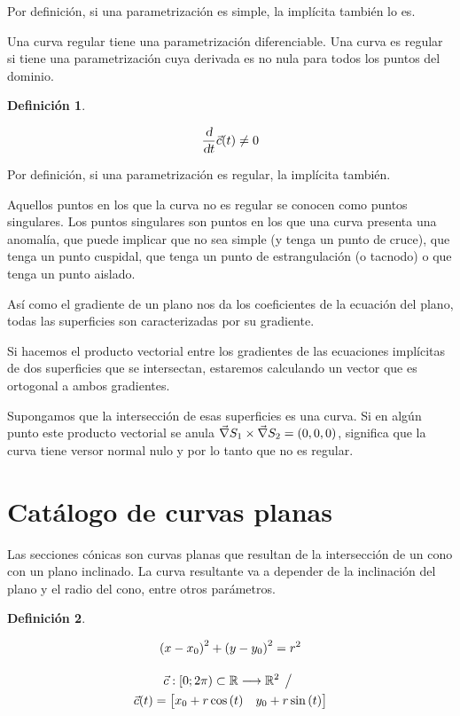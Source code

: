 \documentclass[a5paper,12pt,twoside]{book}
\newtheorem{defn}{{Definición}}[chapter]
\begin{document}
Por definición, si una parametrización es simple, la implícita también lo es.

Una curva regular tiene una parametrización diferenciable. Una curva es regular si tiene una parametrización cuya derivada es no nula para todos los puntos del dominio.

\begin{mdframed}[style=MyFrame1]
    \begin{defn}
    \end{defn}
    \begin{equation*}
        \frac{\textsl{d}}{\textsl{d} t} \Vec{c}(t) \neq 0
    \end{equation*}
\end{mdframed}

Por definición, si una parametrización es regular, la implícita también. 

Aquellos puntos en los que la curva no es regular se conocen como puntos singulares. Los puntos singulares son puntos en los que una curva presenta una anomalía, que puede implicar que no sea simple (y tenga un punto de cruce), que tenga un punto cuspidal, que tenga un punto de estrangulación (o tacnodo) o que tenga un punto aislado.

Así como el gradiente de un plano nos da los coeficientes de la ecuación del plano, todas las superficies son caracterizadas por su gradiente.

Si hacemos el producto vectorial entre los gradientes de las ecuaciones implícitas de dos superficies que se intersectan, estaremos calculando un vector que es ortogonal a ambos gradientes.

Supongamos que la intersección de esas superficies es una curva. Si en algún punto este producto vectorial se anula $\Vec{\nabla} S_1 \times \Vec{\nabla} S_2 = (0,0,0)$, significa que la curva tiene versor normal nulo y por lo tanto que no es regular.


\section{Catálogo de curvas planas}


Las secciones cónicas son curvas planas que resultan de la intersección de un cono con un plano inclinado. La curva resultante va a depender de la inclinación del plano y el radio del cono, entre otros parámetros.

\begin{mdframed}[style=MyFrame1]
    \begin{defn}
    \end{defn}
    \begin{gather*}
        \left(x-x_0\right)^2 + \left(y-y_0\right)^2 = r^2
        \\[1em]
        \Vec{c}:[0;2 \pi) \subset \mathbb{R} \longrightarrow \mathbb{R}^2 \hspace{1ex} \big/ \hspace{1ex}
        \\
        \Vec{c}(t)= \begin{bmatrix} x_0 + r \cos{(t)} & y_0 + r \sin{(t)} \end{bmatrix}
    \end{gather*}
\end{mdframed}
\end{document}
